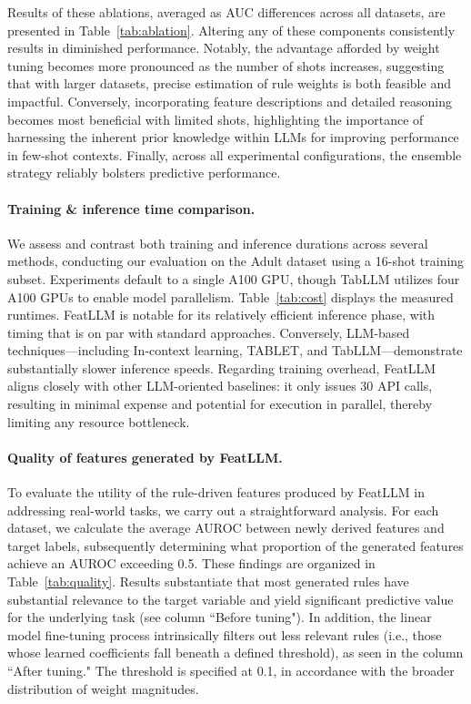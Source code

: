 Results of these ablations, averaged as AUC differences across all datasets, are presented in Table~\ref{tab:ablation}. Altering any of these components consistently results in diminished performance. Notably, the advantage afforded by weight tuning becomes more pronounced as the number of shots increases, suggesting that with larger datasets, precise estimation of rule weights is both feasible and impactful. Conversely, incorporating feature descriptions and detailed reasoning becomes most beneficial with limited shots, highlighting the importance of harnessing the inherent prior knowledge within LLMs for improving performance in few-shot contexts. Finally, across all experimental configurations, the ensemble strategy reliably bolsters predictive performance.

\vspace*{-0.12in}
\paragraph{Training \& inference time comparison.} We assess and contrast both training and inference durations across several methods, conducting our evaluation on the Adult dataset using a 16-shot training subset. Experiments default to a single A100 GPU, though TabLLM utilizes four A100 GPUs to enable model parallelism. Table~\ref{tab:cost} displays the measured runtimes. \textsf{FeatLLM} is notable for its relatively efficient inference phase, with timing that is on par with standard approaches. Conversely, LLM-based techniques—including In-context learning, TABLET, and TabLLM—demonstrate substantially slower inference speeds. Regarding training overhead, \textsf{FeatLLM} aligns closely with other LLM-oriented baselines: it only issues 30 API calls, resulting in minimal expense and potential for execution in parallel, thereby limiting any resource bottleneck.

\vspace*{-0.12in}
\paragraph{Quality of features generated by \textsf{FeatLLM}.}
To evaluate the utility of the rule-driven features produced by \textsf{FeatLLM} in addressing real-world tasks, we carry out a straightforward analysis. For each dataset, we calculate the average AUROC between newly derived features and target labels, subsequently determining what proportion of the generated features achieve an AUROC exceeding 0.5. These findings are organized in Table~\ref{tab:quality}. Results substantiate that most generated rules have substantial relevance to the target variable and yield significant predictive value for the underlying task (see column ``Before tuning"). In addition, the linear model fine-tuning process intrinsically filters out less relevant rules (i.e., those whose learned coefficients fall beneath a defined threshold), as seen in the column ``After tuning." The threshold is specified at 0.1, in accordance with the broader distribution of weight magnitudes.

